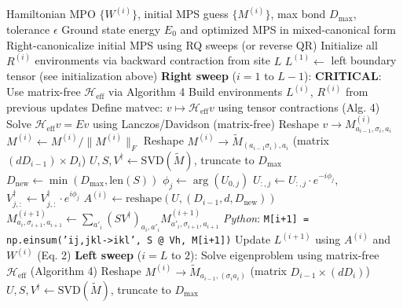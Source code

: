 \documentclass[aps,prb,onecolumn,scriptaddress]{revtex4-2}
\newcommand{\eps}{\epsilon}
\begin{document}
\begin{algorithm}[H]
	\caption{SingleSiteDMRG (with Gauge Control)}
	\begin{algorithmic}[1]
		\Require Hamiltonian MPO $\{W^{(i)}\}$, initial MPS guess $\{M^{(i)}\}$, max bond $D_{\max}$, tolerance $\eps$
		\Ensure Ground state energy $E_0$ and optimized MPS in mixed-canonical form
		\State Right-canonicalize initial MPS using RQ sweeps (or reverse QR)
		\State Initialize all $R^{(i)}$ environments via backward contraction from site $L$
		\State $L^{(1)} \gets$ left boundary tensor (see initialization above)
		\State \textbf{Right sweep} ($i=1$ to $L-1$):
		\State \textbf{CRITICAL}: Use matrix-free $\mathcal{H}_{\text{eff}}$ via Algorithm 4
		\State {}
		\State {}
		\State Build environments $L^{(i)}$, $R^{(i)}$ from previous updates
		\State Define matvec: $v \mapsto \mathcal{H}_{\text{eff}}v$ using tensor contractions (Alg. 4)
		\State Solve $\mathcal{H}_{\text{eff}} v = E v$ using Lanczos/Davidson (matrix-free)
		\State Reshape $v \to M^{(i)}_{a_{i-1},\sigma_i,a_i}$
		\State $M^{(i)} \gets M^{(i)} / \|M^{(i)}\|_F$ 
		\State Reshape $M^{(i)} \to \tilde{M}_{(a_{i-1}\sigma_i), a_i}$ (matrix $(dD_{i-1}) \times D_i$)
		\State $U, S, V^\dagger \gets \text{SVD}(\tilde{M})$, truncate to $D_{\max}$
		\State $D_{\text{new}} \gets \min(D_{\max}, \text{len}(S))$
		\State {}
		\State $\phi_j \gets \arg(U_{0,j})$
		\State $U_{:,j} \gets U_{:,j} \cdot e^{-i\phi_j}$, $V^\dagger_{j,:} \gets V^\dagger_{j,:} \cdot e^{i\phi_j}$
		\EndFor
		\State $A^{(i)} \gets \text{reshape}(U, (D_{i-1}, d, D_{\text{new}}))$
		\State {}
		\State $M^{(i+1)}_{a_i,\sigma_{i+1},a_{i+1}} \gets \sum_{a'_i} (SV^\dagger)_{a_i,a'_i} M^{(i+1)}_{a'_i,\sigma_{i+1},a_{i+1}}$
		\State \textit{Python}: \texttt{M[i+1] = np.einsum('ij,jkl->ikl', S @ Vh, M[i+1])}
		\State Update $L^{(i+1)}$ using $A^{(i)}$ and $W^{(i)}$ (Eq. 2)
		\EndFor
		\State \textbf{Left sweep} ($i=L$ to $2$):
		\State Solve eigenproblem using matrix-free $\mathcal{H}_{\text{eff}}$ (Algorithm 4)
		\State Reshape $M^{(i)} \to \tilde{M}_{a_{i-1}, (\sigma_i a_i)}$ (matrix $D_{i-1} \times (dD_i)$)
		\State $U, S, V^\dagger \gets \text{SVD}(\tilde{M})$, truncate to $D_{\max}$

\end{algorithmic}
\end{algorithm}
\end{document}
